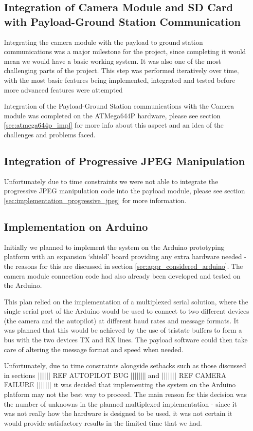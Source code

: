 \subsection{Integration of Camera Module and SD Card with Payload-Ground Station Communication}
Integrating the camera module with the payload to ground station communications
was a major milestone for the project, since completing it would mean we would
have a basic working system. It was also one of the most challenging parts of
the project. This step was performed iteratively over time, with the most basic
features being implemented, integrated and tested before more advanced features
were attempted

Integration of the Payload-Ground Station communications with the Camera module
was completed on the ATMega644P hardware, please see section \ref{sec:atmega644p_impl}
for more info about this aspect and an idea of the challenges and problems
faced.

\subsection{Integration of Progressive JPEG Manipulation}
Unfortunately due to time constraints we were not able to integrate the
progressive JPEG manipulation code into the payload module, please see section \ref{sec:implementation_progressive_jpeg} for more information.

\subsection{Implementation on Arduino}
\label{sec:implementation_arduino}
Initially we planned to implement the system on the Arduino prototyping 
platform with an expansion `shield' board providing any extra hardware needed -
the reasons for this are discussed in section \ref{sec:appr_considered_arduino}.
The camera module connection code had also already been developed and tested on
the Arduino. 

This plan relied on the implementation of a multiplexed serial solution, where
the single serial port of the Arduino would be used to connect to two different
devices (the camera and the autopilot) at different baud rates and message
formats. It was planned that this would be achieved by the use of tristate
buffers to form a bus with the two devices TX and RX lines. The payload software
could then take care of altering the message format and speed when needed.

Unfortunately, due to time constraints alongside setbacks such as those
discussed in sections ||||||| REF AUTOPILOT BUG |||||||| and |||||||| REF 
CAMERA FAILURE |||||||| it was decided that implementing the system on the 
Arduino platform may not the best way to proceed. The main reason for this 
decision was the number of unknowns in the planned multiplexed implementation
- since it was not really how the hardware is designed to be used, it was not
certain it would provide satisfactory results in the limited time that we had.


